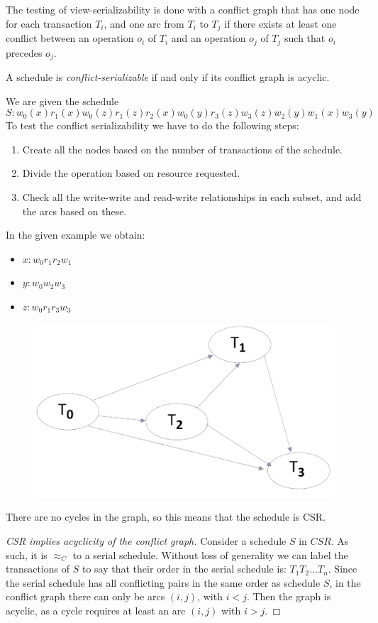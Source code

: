 \documentclass[12pt, a4paper]{report}
\begin{document}
    The testing of view-serializability is done with a conflict graph that has one node for each transaction $T_i$, and one arc from $T_i$ to $T_j$ if there exists at least one conflict between an operation $o_i$ of $T_i$ and an operation $o_j$ of $T_j$ such that $o_i$ precedes $o_j$.
    \begin{theorem}
        A schedule is \emph{conflict-serializable} if and only if its conflict graph is acyclic.
    \end{theorem}
    \begin{example}
        We are given the schedule \[S: w_0(x) r_1(x) w_0(z) r_1(z) r_2(x) w_0(y) r_3(z) w_3(z) w_2(y) w_1(x) w_3(y)\]
        To test the conflict serializability we have to do the following steps: 
        \begin{enumerate}
            \item Create all the nodes based on the number of transactions of the schedule. 
            \item Divide the operation based on resource requested.
            \item Check all the write-write and read-write relationships in each subset, and add the arcs based on these. 
        \end{enumerate}
        In the given example we obtain: 
        \begin{itemize}
            \item $x: w_0 r_1 r_2 w_1$
            \item $y: w_0 w_2 w_3$
            \item $z: w_0 r_1 r_3 w_3$
        \end{itemize}
        \begin{figure}[H]
            \centering
            \includegraphics[width=0.5\linewidth]{images/conflict.png}
        \end{figure}
        There are no cycles in the graph, so this means that the schedule is CSR. 
    \end{example}
    \begin{proof}[CSR implies acyclicity of the conflict graph]
        Consider a schedule $S$ in $CSR$. As such, it is $\approx_C$ to a serial schedule. 
        Without loss of generality we can label the transactions of $S$ to say that their order in the serial schedule is: $T_1 T_2 \dots T_n$.
        Since the serial schedule has all conflicting pairs in the same order as schedule $S$, in the conflict graph there can only be arcs $(i,j)$, with $i<j$. 
        Then the graph is acyclic, as a cycle requires at least an arc $(i,j)$ with $i>j$.
    \end{proof}
\end{document}
